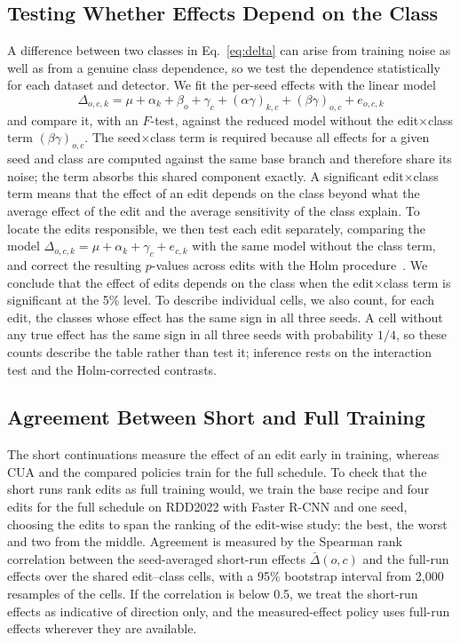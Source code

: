 \documentclass[conference]{IEEEtran}
\begin{document}
\subsection{Testing Whether Effects Depend on the Class}
\label{sec:measure_tests}

A difference between two classes in Eq.~\eqref{eq:delta} can arise from training noise as well as from a genuine class dependence, so we test the dependence statistically for each dataset and detector. We fit the per-seed effects with the linear model
\begin{equation}
\Delta_{o,c,k}=\mu+\alpha_k+\beta_o+\gamma_c+(\alpha\gamma)_{k,c}+(\beta\gamma)_{o,c}+e_{o,c,k}
\label{eq:anova}
\end{equation}
and compare it, with an $F$-test, against the reduced model without the edit$\times$class term $(\beta\gamma)_{o,c}$. The seed$\times$class term is required because all effects for a given seed and class are computed against the same base branch and therefore share its noise; the term absorbs this shared component exactly. A significant edit$\times$class term means that the effect of an edit depends on the class beyond what the average effect of the edit and the average sensitivity of the class explain. To locate the edits responsible, we then test each edit separately, comparing the model $\Delta_{o,c,k}=\mu+\alpha_k+\gamma_c+e_{c,k}$ with the same model without the class term, and correct the resulting $p$-values across edits with the Holm procedure~\cite{holm1979}. We conclude that the effect of edits depends on the class when the edit$\times$class term is significant at the 5\% level. To describe individual cells, we also count, for each edit, the classes whose effect has the same sign in all three seeds. A cell without any true effect has the same sign in all three seeds with probability $1/4$, so these counts describe the table rather than test it; inference rests on the interaction test and the Holm-corrected contrasts.

\subsection{Agreement Between Short and Full Training}
\label{sec:measure_proxy}

The short continuations measure the effect of an edit early in training, whereas CUA and the compared policies train for the full schedule. To check that the short runs rank edits as full training would, we train the base recipe and four edits for the full schedule on RDD2022 with Faster R-CNN and one seed, choosing the edits to span the ranking of the edit-wise study: the best, the worst and two from the middle. Agreement is measured by the Spearman rank correlation between the seed-averaged short-run effects $\bar\Delta(o,c)$ and the full-run effects over the shared edit--class cells, with a 95\% bootstrap interval from 2,000 resamples of the cells. If the correlation is below 0.5, we treat the short-run effects as indicative of direction only, and the measured-effect policy uses full-run effects wherever they are available.
\end{document}
